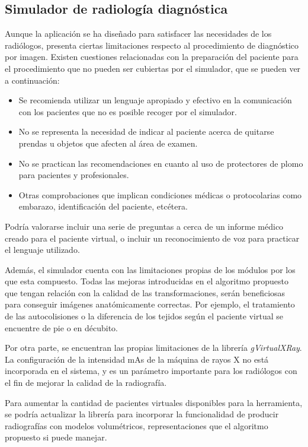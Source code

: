 \subsection{Simulador de radiología diagnóstica}

Aunque la aplicación se ha diseñado para satisfacer las necesidades de los radiólogos, presenta ciertas limitaciones respecto al procedimiento de diagnóstico por imagen. Existen cuestiones relacionadas con la preparación del paciente para el procedimiento que no pueden ser cubiertas por el simulador, que se pueden ver a continuación:

\begin{itemize}
    \item Se recomienda utilizar un lenguaje apropiado y efectivo en la comunicación con los pacientes que no es posible recoger por el simulador.
    \item No se representa la necesidad de indicar al paciente acerca de quitarse prendas u objetos que afecten al área de examen.
    \item No se practican las recomendaciones en cuanto al uso de protectores de plomo para pacientes y profesionales.
    \item Otras comprobaciones que implican condiciones médicas o protocolarias como embarazo, identificación del paciente, etcétera.
\end{itemize}
Podría valorarse incluir una serie de preguntas a cerca de un informe médico creado para el paciente virtual, o incluir un reconocimiento de voz para practicar el lenguaje utilizado. 

Además, el simulador cuenta con las limitaciones propias de los módulos por los que esta compuesto. Todas las mejoras introducidas en el algoritmo propuesto que tengan relación con la calidad de las transformaciones, serán beneficiosas para conseguir imágenes anatómicamente correctas. Por ejemplo, el tratamiento de las autocolisiones o la diferencia de los tejidos según el paciente virtual se encuentre de pie o en décubito.


Por otra parte, se encuentran las propias limitaciones de la librería \emph{gVirtualXRay}. La configuración de la intensidad \acs{mAs} de la máquina de rayos X no está incorporada en el sistema, y es un parámetro importante para los radiólogos con el fin de mejorar la calidad de la radiografía.

Para aumentar la cantidad de pacientes virtuales disponibles para la herramienta, se podría actualizar la librería para incorporar la funcionalidad de producir radiografías con modelos volumétricos, representaciones que el algoritmo propuesto si puede manejar.

